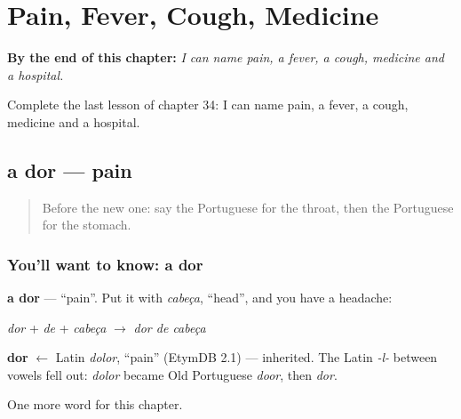 
\chapter{Pain, Fever, Cough, Medicine}
\label{ch:pt-pain-fever-cough-medicine}

\begin{chapteropening}
\textbf{By the end of this chapter:} \emph{I can name pain, a fever, a cough, medicine and a hospital.}

Complete the last lesson of chapter 34: I can name pain, a fever, a cough, medicine and a hospital.
\end{chapteropening}

\section[a dor]{a dor — pain}

\label{lesson:PT-C34-dor}



\begin{quote}
Before the new one: say the Portuguese for the throat, then the Portuguese for the stomach.
\end{quote}

\subsection*{You'll want to know: a dor}
\textbf{a dor} — \textquotedblleft{}pain\textquotedblright{}. Put it with \emph{cabeça}, \textquotedblleft{}head\textquotedblright{}, and you have a headache:

\emph{dor} + \emph{de} + \emph{cabeça} $\to$ \emph{dor de cabeça}

\begin{cousinweb}
\textbf{dor} $\leftarrow$ Latin \emph{dolor}, \textquotedblleft{}pain\textquotedblright{} (EtymDB 2.1) — inherited. The Latin \emph{-l-} between vowels fell out: \emph{dolor} became Old Portuguese \emph{door}, then \emph{dor}.
\end{cousinweb}

\begin{grammarlens}[title={What you've built}]
One more word for this chapter.
\end{grammarlens}

